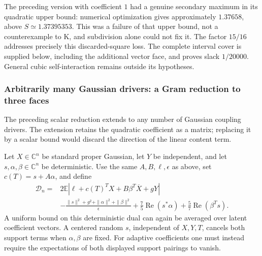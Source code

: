 The preceding version with coefficient $1$ had a genuine secondary maximum
in its quadratic upper bound: numerical optimization gives approximately
$1.37658$, above $S\simeq1.37395353$.  This was a failure of that upper bound,
not a counterexample to K, and subdivision alone could not fix it.
The factor $15/16$ addresses precisely this discarded-square loss.  The
complete interval cover is supplied below, including the additional
vector face, and proves slack $1/20000$.  General cubic self-interaction
remains outside its hypotheses.

\subsubsection{Arbitrarily many Gaussian drivers: a Gram reduction to three faces}
\label{sec:vector-gram-reduction}

The preceding scalar reduction extends to any number of Gaussian coupling
drivers.  The extension retains the quadratic coefficient as a matrix;
replacing it by a scalar bound would discard the direction of the linear
content term.

Let $X\in\mathbb C^n$ be standard proper Gaussian, let $Y$ be independent,
and let $s,\alpha,\beta\in\mathbb C^n$ be deterministic.  Use the same
$A,B,\ell,\epsilon$ as above, set $c(T)=s+A\alpha$, and define
\begin{align*}
 \mathcal D_n={}&2\mathbb E|\ell+c(T)^TX+B\beta^T\overline X+gY|\\
 &-\frac{\|s\|^2+g^2+\|\alpha\|^2+\|\beta\|^2}{\epsilon}
   +\frac75\operatorname{Re}(s^*\alpha)
   +\frac57\operatorname{Re}(\beta^Ts).
\end{align*}
A uniform bound on this deterministic dual can again be averaged over
latent coefficient vectors.  A centered random $s$, independent of
$X,Y,T$, cancels both support terms when $\alpha,\beta$ are fixed.  For
adaptive coefficients one must instead require the expectations of both
displayed support pairings to vanish.

